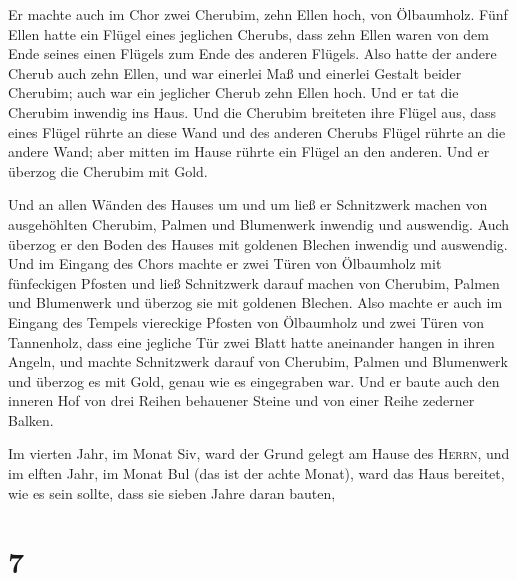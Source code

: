  Er machte auch im Chor zwei Cherubim, zehn Ellen hoch,
von Ölbaumholz.  Fünf Ellen hatte ein Flügel eines
jeglichen Cherubs, dass zehn Ellen waren von dem Ende seines einen
Flügels zum Ende des anderen Flügels.  Also hatte der
andere Cherub auch zehn Ellen, und war einerlei Maß und einerlei Gestalt
beider Cherubim;  auch war ein jeglicher Cherub zehn
Ellen hoch.  Und er tat die Cherubim inwendig ins Haus.
Und die Cherubim breiteten ihre Flügel aus, dass eines Flügel rührte an
diese Wand und des anderen Cherubs Flügel rührte an die andere Wand;
aber mitten im Hause rührte ein Flügel an den anderen. 
Und er überzog die Cherubim mit Gold.

 Und an allen Wänden des Hauses um und um ließ er
Schnitzwerk machen von ausgehöhlten Cherubim, Palmen und Blumenwerk
inwendig und auswendig.  Auch überzog er den Boden des
Hauses mit goldenen Blechen inwendig und auswendig.  Und
im Eingang des Chors machte er zwei Türen von Ölbaumholz mit fünfeckigen
Pfosten  und ließ Schnitzwerk darauf machen von Cherubim,
Palmen und Blumenwerk und überzog sie mit goldenen Blechen.
 Also machte er auch im Eingang des Tempels viereckige
Pfosten von Ölbaumholz  und zwei Türen von Tannenholz,
dass eine jegliche Tür zwei Blatt hatte aneinander hangen in ihren
Angeln,  und machte Schnitzwerk darauf von Cherubim,
Palmen und Blumenwerk und überzog es mit Gold, genau wie es eingegraben
war.  Und er baute auch den inneren Hof von drei Reihen
behauener Steine und von einer Reihe zederner Balken.

 Im vierten Jahr, im Monat Siv, ward der Grund gelegt am
Hause des \textsc{Herrn},  und im elften Jahr, im Monat
Bul (das ist der achte Monat), ward das Haus bereitet, wie es sein
sollte, dass sie sieben Jahre daran bauten,

\hypertarget{section-6}{%
\section{7}\label{section-6}}

